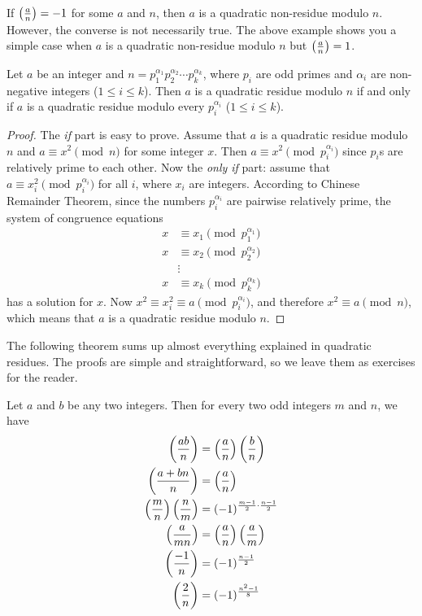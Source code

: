 \begin{note}
	If $\left(\frac{a}{n}\right)=-1$ for some $a$ and $n$, then $a$ is a quadratic non-residue modulo $n$. However, the converse is not necessarily true. The above example shows you a simple case when $a$ is a quadratic non-residue modulo $n$ but $\left(\frac{a}{n}\right)=1$.
\end{note}

\begin{theorem}
	Let $a$ be an integer and $n=p_1^{\alpha_1}p_2^{\alpha_2}\cdots p_k^{\alpha_k}$, where $p_i$ are odd primes and $\alpha_i$ are non-negative integers ($1 \leq i \leq k$). Then $a$ is a quadratic residue modulo $n$ if and only if $a$ is a quadratic residue modulo every $p_i^{\alpha_i}$  ($1 \leq i \leq k$).
\end{theorem}

\begin{proof}
	The \textit{if} part is easy to prove. Assume that $a$ is a quadratic residue modulo $n$ and $a \equiv x^2 \pmod n$ for some integer $x$. Then $a \equiv x^2 \pmod{p_i^{\alpha_i}}$ since $p_i$s are relatively prime to each other. Now the \textit{only if} part: assume that $a \equiv x_i^2 \pmod{p_i^{\alpha_i}}$ for all $i$, where $x_i$ are integers. According to Chinese Remainder Theorem, since the numbers ${p_i^{\alpha_i}}$ are pairwise relatively prime, the system of congruence equations
	\begin{align*}
		x & \equiv x_1\pmod{p_1^{\alpha_1}}\\
		x & \equiv x_2\pmod{p_2^{\alpha_2}}\\
		& \vdots\\
		x & \equiv x_k\pmod{p_k^{\alpha_k}}
	\end{align*}
	has a solution for $x$. Now $x^2 \equiv x_i^2 \equiv a \pmod{p_i^{\alpha_i}}$, and therefore $x^2 \equiv a \pmod n$, which means that $a$ is a quadratic residue modulo $n$.
\end{proof}

The following theorem sums up almost everything explained in quadratic residues. The proofs are simple and straightforward, so we leave them as exercises for the reader.
	\begin{theorem}
		Let $a$ and $b$ be any two integers. Then for every two odd integers $m$ and $n$, we have
			\begin{align*}
				\left(\frac{ab}{n}\right)
					& = \left(\frac{a}{n}\right)\left(\frac{b}{n}\right)\\
				\left(\frac{a+bn}{n}\right)
					& = \left(\frac{a}{n}\right)\\
				\left(\dfrac{m}{n}\right)\left(\dfrac{n}{m}\right)
					& = (-1)^{\frac{m-1}{2}\cdot \frac{n-1}{2}}\\
				\left(\frac{a}{mn}\right)
					& = \left(\frac{a}{n}\right)\left(\frac{a}{m}\right)\\
				\left(\frac{-1}{n}\right)
					& = (-1)^{\frac{n-1}{2}}\\
				\left(\frac{2}{n}\right)
					& = (-1)^{\frac{n^2-1}{8}}
			\end{align*}
	\end{theorem}


